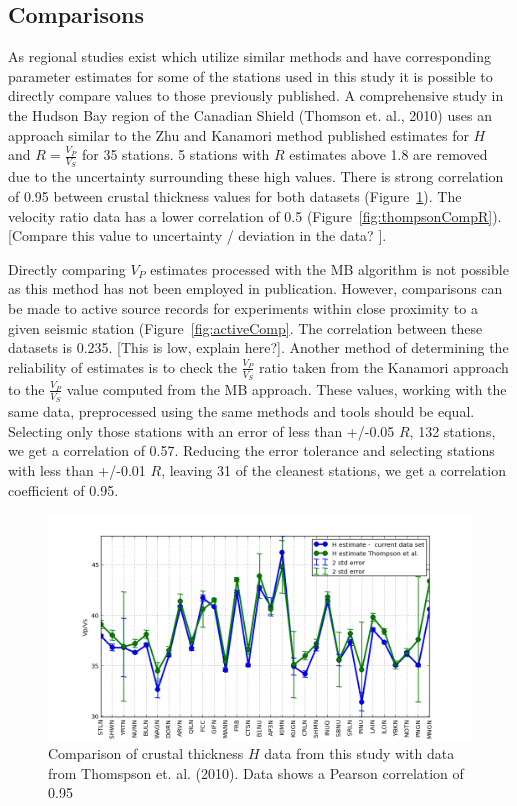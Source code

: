 \documentclass[draft, 12pt]{article}
\begin{document}
\subsection{Comparisons}
As regional studies exist which utilize similar methods and have corresponding parameter estimates for some of the stations used in this study it is possible to directly compare values to those previously published. A comprehensive study in the Hudson Bay region of the Canadian Shield (Thomson et. al., 2010) uses an approach similar to the Zhu and Kanamori method published estimates for $H$ and $R=\frac{V_P}{V_S}$ for 35 stations. 5 stations with $R$ estimates above 1.8 are removed due to the uncertainty surrounding these high values. There is strong correlation of 0.95 between crustal thickness values for both datasets (Figure~\ref{fig:thompsonCompH}). The velocity ratio data has a lower correlation of 0.5 (Figure~\ref{fig:thompsonCompR}). [Compare this value to uncertainty / deviation in the data? ].

Directly comparing $V_P$ estimates processed with the MB algorithm is not possible as this method has not been employed in publication. However, comparisons can be made to active source records for experiments within close proximity to a given seismic station (Figure~\ref{fig:activeComp}. The correlation between these datasets is 0.235. [This is low, explain here?]. Another method of determining the reliability of estimates is to check the $\frac{V_P}{V_S}$ ratio taken from the Kanamori approach to the $\frac{V_P}{V_S}$ value computed from the MB approach. These values, working with the same data, preprocessed using the same methods and tools should be equal. Selecting only those stations with an error of less than +/-0.05 $R$, 132 stations, we get a correlation of 0.57. Reducing the error tolerance and selecting stations with less than +/-0.01 $R$, leaving 31 of the cleanest stations, we get a correlation coefficient of 0.95.

\begin{figure}
  \centering
    \includegraphics[width=\textwidth]{thompsonComparisonH}
  \caption{Comparison of crustal thickness $H$ data from this study with data from Thomspson et. al. (2010). Data shows a Pearson correlation of 0.95}
  \label{fig:thompsonCompH}
\end{figure}
\end{document}
